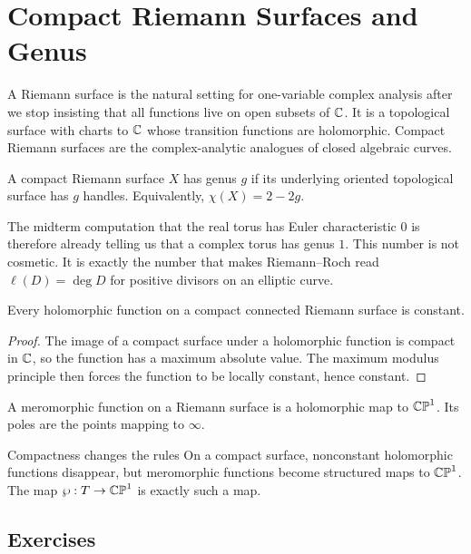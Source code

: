 \chapter{Compact Riemann Surfaces and Genus}
\label{ch:riemann-surfaces}

A Riemann surface is the natural setting for one-variable complex analysis after
we stop insisting that all functions live on open subsets of \(\mathbb{C}\).  It is a
topological surface with charts to \(\mathbb{C}\) whose transition functions are
holomorphic.  Compact Riemann surfaces are the complex-analytic analogues of
closed algebraic curves.

\begin{definition}
A compact Riemann surface \(X\) has genus \(g\) if its underlying oriented
topological surface has \(g\) handles.  Equivalently,
\(\chi(X)=2-2g\).
\end{definition}

The midterm computation that the real torus has Euler characteristic \(0\) is
therefore already telling us that a complex torus has genus \(1\).  This number is
not cosmetic.  It is exactly the number that makes Riemann--Roch read
\(\ell(D)=\deg D\) for positive divisors on an elliptic curve.

\begin{proposition}
\label{prop:compact-functions}
Every holomorphic function on a compact connected Riemann surface is constant.
\end{proposition}

\begin{proof}
The image of a compact surface under a holomorphic function is compact in \(\mathbb{C}\),
so the function has a maximum absolute value.  The maximum modulus principle then
forces the function to be locally constant, hence constant.
\end{proof}

\begin{definition}
A meromorphic function on a Riemann surface is a holomorphic map to
\(\mathbb{CP}^1\).  Its poles are the points mapping to \(\infty\).
\end{definition}

\begin{keyidea}{Compactness changes the rules}
On a compact surface, nonconstant holomorphic functions disappear, but
meromorphic functions become structured maps to \(\mathbb{CP}^1\).  The map
\(\wp:T\to\mathbb{CP}^1\) is exactly such a map.
\end{keyidea}

\section*{Exercises}

